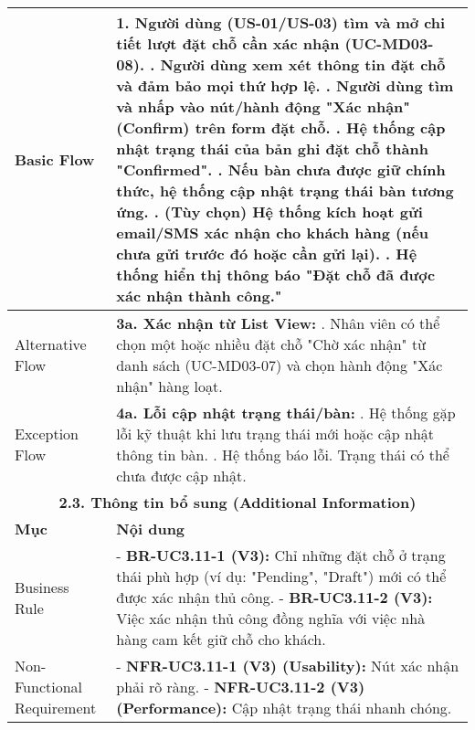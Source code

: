 \begin{longtable}{|m{4cm}|p{11cm}|}
\hline
Basic Flow & 1. Người dùng (US-01/US-03) tìm và mở chi tiết lượt đặt chỗ cần xác nhận (UC-MD03-08). \newline 2. Người dùng xem xét thông tin đặt chỗ và đảm bảo mọi thứ hợp lệ. \newline 3. Người dùng tìm và nhấp vào nút/hành động "Xác nhận" (Confirm) trên form đặt chỗ. \newline 4. Hệ thống cập nhật trạng thái của bản ghi đặt chỗ thành "Confirmed". \newline 5. Nếu bàn chưa được giữ chính thức, hệ thống cập nhật trạng thái bàn tương ứng. \newline 6. (Tùy chọn) Hệ thống kích hoạt gửi email/SMS xác nhận cho khách hàng (nếu chưa gửi trước đó hoặc cần gửi lại). \newline 7. Hệ thống hiển thị thông báo "Đặt chỗ đã được xác nhận thành công." \\
\hline
Alternative Flow & \textbf{3a. Xác nhận từ List View:} \newline    1. Nhân viên có thể chọn một hoặc nhiều đặt chỗ "Chờ xác nhận" từ danh sách (UC-MD03-07) và chọn hành động "Xác nhận" hàng loạt. \\
\hline
Exception Flow & \textbf{4a. Lỗi cập nhật trạng thái/bàn:} \newline    1. Hệ thống gặp lỗi kỹ thuật khi lưu trạng thái mới hoặc cập nhật thông tin bàn. \newline    2. Hệ thống báo lỗi. Trạng thái có thể chưa được cập nhật. \\
\hline
\multicolumn{2}{|c|}{\textbf{2.3. Thông tin bổ sung (Additional Information)}} \\
\hline
\textbf{Mục} & \textbf{Nội dung} \\
\hline
Business Rule & - \textbf{BR-UC3.11-1 (V3):} Chỉ những đặt chỗ ở trạng thái phù hợp (ví dụ: "Pending", "Draft") mới có thể được xác nhận thủ công. \newline - \textbf{BR-UC3.11-2 (V3):} Việc xác nhận thủ công đồng nghĩa với việc nhà hàng cam kết giữ chỗ cho khách. \\
\hline
Non-Functional Requirement & - \textbf{NFR-UC3.11-1 (V3) (Usability):} Nút xác nhận phải rõ ràng. \newline - \textbf{NFR-UC3.11-2 (V3) (Performance):} Cập nhật trạng thái nhanh chóng. \\
\hline
\end{longtable}

